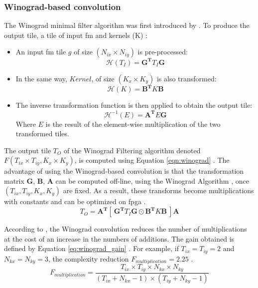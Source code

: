 \subsubsection{Winograd-based convolution}
%
The Winograd minimal filter algorithm was first introduced by \cite{winograd_arithmetic_1980}. To produce the output tile, a tile of input \acrshort{fm} and kernels (K) \cite{abdelouahab_accelerating_2018}:
\begin{itemize}
    \item An input \acrshort{fm} tile $g$ of size $(N_{ix} \times N_{iy})$ is pre-processed: $$\mathcal{H}(T_I) = \boldsymbol{G^{T}} T_I \boldsymbol{G} $$
    \item In the same way, $Kernel$, of size $(K_x \times K_y)$ is also transformed: $$\mathcal{H}(K) = \boldsymbol{B^{T}} K \boldsymbol{B}$$
    \item The inverse transformation function is then applied to obtain the output tile: $$\mathcal{H}^{-1}(E) = \boldsymbol{A^{T}} E \boldsymbol{G}$$ Where $E$ is the result of the element-wise multiplication of the two transformed tiles.
\end{itemize}
The output tile $T_O$ of the Winograd Filtering algorithm denoted $F(T_{ix} \times T_{iy}, K_x \times K_y)$, is computed using Equation \eqref{eqn:winograd} \cite{winograd_arithmetic_1980}. The advantage of using the Winograd-based convolution is that the transformation matrix $\boldsymbol{G}$, $\boldsymbol{B}$, $\boldsymbol{A}$ can be computed off-line, using the Winograd Algorithm \cite{winograd_arithmetic_1980}, once $(T_{ix}, T_{iy}, K_x, K_y)$ are fixed. As a result, these transforms become multiplications with constants and can be optimized on \acrshort{fpga} \cite{liang_evaluating_2020}.
%
\begin{equation}
    T_O = \boldsymbol{A^{T}} [ \ \boldsymbol{G^{T}} T_I \boldsymbol{G} \odot \boldsymbol{B^{T}} K\boldsymbol{B} \ ] \boldsymbol{A}
    \label{eqn:winograd}
\end{equation}

According to \textcite{winograd_arithmetic_1980}, the Winograd convolution reduces the number of multiplications at the cost of an increase in the numbers of additions. The gain obtained is defined by Equation \eqref{eq:winograd_gain} \cite{winograd_arithmetic_1980}. For example, if $T_{ix} = T_{iy} = 2$ and $N_{kx} = N_{ky} = 3$, the complexity reduction $F_{multiplication} = 2.25$ \cite{lavin_fast_2015}.
%
\begin{equation}
    F_{multiplication} = \frac{T_{ix} \times T_{iy} \times N_{kx} \times N_{ky}}{(T_{ix} + N_{kx} - 1) \times (T_{iy} + N_{ky} - 1)}
    \label{eq:winograd_gain}
\end{equation}
%
